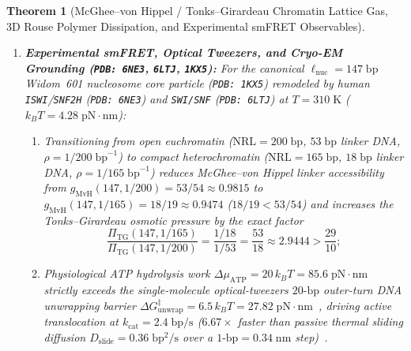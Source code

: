 \documentclass[11pt,a4paper]{article}
\newtheorem{theorem}{Theorem}[section]
\theoremstyle{definition}
\begin{document}
\begin{theorem}[McGhee--von Hippel / Tonks--Girardeau Chromatin Lattice Gas, 3D Rouse Polymer Dissipation, and Experimental smFRET Observables]
\begin{enumerate}
\begin{equation}
  \end{equation}
  \item \textbf{Experimental smFRET, Optical Tweezers, and Cryo-EM Grounding (\texttt{PDB: 6NE3}, \texttt{6LTJ}, \texttt{1KX5}):} For the canonical $\ell_{\mathrm{nuc}} = 147\;\mathrm{bp}$ Widom~601 nucleosome core particle (\texttt{PDB: 1KX5}) remodeled by human \texttt{ISWI}/\texttt{SNF2H} (\texttt{PDB: 6NE3}) and \texttt{SWI/SNF} (\texttt{PDB: 6LTJ}) at $T = 310\;\mathrm{K}$ ($k_B T = 4.28\;\mathrm{pN\cdot nm}$):
  \begin{enumerate}
    \item Transitioning from open euchromatin ($\mathrm{NRL} = 200\;\mathrm{bp}$, $53\;\mathrm{bp}$ linker DNA, $\rho = 1/200\;\mathrm{bp}^{-1}$) to compact heterochromatin ($\mathrm{NRL} = 165\;\mathrm{bp}$, $18\;\mathrm{bp}$ linker DNA, $\rho = 1/165\;\mathrm{bp}^{-1}$) reduces McGhee--von Hippel linker accessibility from $g_{\mathrm{MvH}}(147, 1/200) = 53/54 \approx 0.9815$ to $g_{\mathrm{MvH}}(147, 1/165) = 18/19 \approx 0.9474$ ($18/19 < 53/54$) and increases the Tonks--Girardeau osmotic pressure by the exact factor
    \begin{equation}
      \frac{\Pi_{\mathrm{TG}}(147, 1/165)}{\Pi_{\mathrm{TG}}(147, 1/200)} = \frac{1/18}{1/53} = \frac{53}{18} \approx 2.9444 > \frac{29}{10};
    \end{equation}
    \item Physiological ATP hydrolysis work $\Delta\mu_{\mathrm{ATP}} = 20\,k_B T = 85.6\;\mathrm{pN\cdot nm}$ strictly exceeds the single-molecule optical-tweezers $20\text{-bp}$ outer-turn DNA unwrapping barrier $\Delta G_{\mathrm{unwrap}}^{\ddagger} = 6.5\,k_B T = 27.82\;\mathrm{pN\cdot nm}$~\cite{Hall2009}, driving active translocation at $k_{\mathrm{cat}} = 2.4\;\mathrm{bp/s}$ ($6.67\times$ faster than passive thermal sliding diffusion $D_{\mathrm{slide}} = 0.36\;\mathrm{bp^2/s}$ over a $1\text{-bp} = 0.34\;\mathrm{nm}$ step)~\cite{Blosser2009,Deindl2013}.
  \end{enumerate}
\end{enumerate}
\end{theorem}
\end{document}
